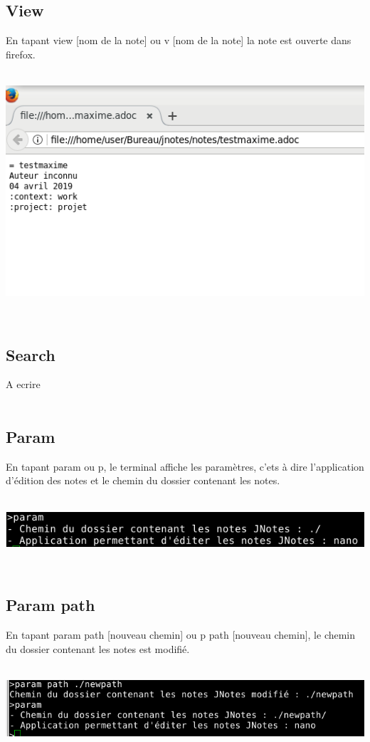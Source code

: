 \documentclass[a4paper,11pt]{article}
\begin{document}
		\subsection{View}
			En tapant view [nom de la note] ou v [nom de la note] la note est ouverte dans firefox.\\
			\\
			\centerline{\includegraphics[scale=0.9]{Captures/view.png}}
			\\
		\subsection{Search}
			A ecrire
			\\
			\\
		\subsection{Param}
			En tapant param ou p, le terminal affiche les paramètres, c'ets à dire l'application d'édition des notes et le chemin du dossier contenant les notes.\\
			\\
			\centerline{\includegraphics[scale=0.9]{Captures/param.png}}
			\\	
		\subsection{Param path}
			En tapant param path [nouveau chemin] ou p path [nouveau chemin], le chemin du dossier contenant les notes est modifié.\\
			\\
			\centerline{\includegraphics[scale=0.6]{Captures/parampath.png}}
			\\	
\end{document}
